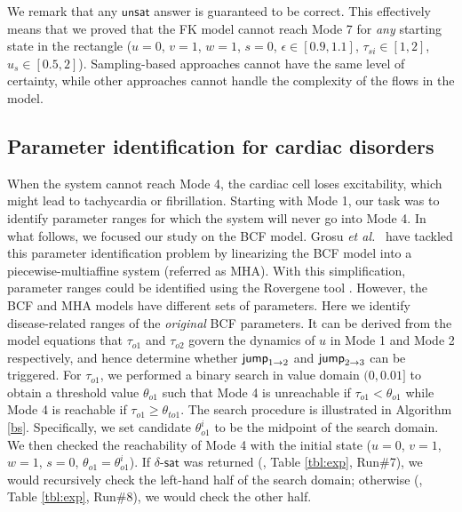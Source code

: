 We remark that any $\mathsf{unsat}$ answer is guaranteed to be correct. This effectively
means that we proved that the FK model cannot reach Mode 7 for {\em any} starting state in the
rectangle ($u = 0$, $v = 1$, $w = 1$, $s = 0$, $\epsilon \in [0.9,1.1]$, $\tau_{si} \in [1,2]$,
$u_s \in [0.5,2]$). Sampling-based approaches cannot have the same level of certainty, while other
approaches cannot handle the complexity of the flows in the model.


\subsection{Parameter identification for cardiac disorders}

When the system cannot reach Mode 4, the cardiac cell loses excitability, which might lead to tachycardia or fibrillation. Starting with Mode 1, our task was to identify parameter ranges for which the system will never go into Mode 4. In what follows, we focused our study on the BCF model.
Grosu {\em et al.}~\cite{grosu11} have tackled this parameter identification problem by linearizing the BCF model into a piecewise-multiaffine system (referred as MHA). With this simplification, parameter ranges could be identified using the Rovergene tool \cite{rovergene}. However, the BCF and MHA models have different sets of parameters. Here we identify disease-related ranges of the {\em original} BCF parameters. It can be derived from the model equations that $\tau_{o1}$ and $\tau_{o2}$ govern the dynamics of $u$ in Mode 1 and Mode 2 respectively, and hence determine whether $\mathsf{jump}_{1\rightarrow 2}$ and  $\mathsf{jump}_{2\rightarrow 3}$ can be triggered. For $\tau_{o1}$, we performed a binary search in value domain $(0,0.01]$ to obtain a threshold value $\theta_{o1}$ such that Mode 4 is unreachable if $\tau_{o1} < \theta_{o1}$ while Mode 4 is reachable if $\tau_{o1} \ge \theta_{to1}$. The search procedure is illustrated in Algorithm \ref{bs}. Specifically, we set candidate $\theta^i_{o1}$ to be the midpoint of the search domain. We then checked the reachability of Mode 4 with the initial state ($u = 0$, $v = 1$, $w = 1$, $s = 0$, $\theta_{o1} = \theta^i_{o1}$). If $\delta$-$\mathsf{sat}$ was returned (\eg, Table \ref{tbl:exp}, Run\#7), we would recursively check the left-hand half of the search domain; otherwise (\eg, Table \ref{tbl:exp}, Run\#8), we would check the other half.

